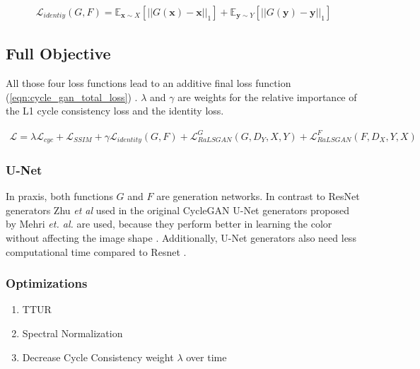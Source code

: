 \documentclass[a4paper,11pt, DIV=12]{scrartcl}
\newcommand{\x}{\boldsymbol{x}}
\newcommand{\y}{\boldsymbol{y}}
\begin{document}
\begin{equation}
   \label{eqn:identity_loss}
   \begin{aligned}
      \mathcal{L}_{identiy}(G, F) = \mathbb{E}_{\x \sim X} \left[||G(\x) - \x||_1\right] + \mathbb{E}_{\y \sim Y} \left[||G(\y) - \y||_1\right]
   \end{aligned}
\end{equation}

\subsection*{Full Objective}
All those four loss functions lead to an additive final loss function (\autoref{eqn:cycle_gan_total_loss}) \cite{mehri2019colorizing}.
$\lambda$ and $\gamma$ are weights for the relative importance of the L1 cycle consistency loss and the identity loss.

\begin{equation}
   \label{eqn:cycle_gan_total_loss}
   \begin{aligned}
      \mathcal{L} = \lambda \mathcal{L}_{cyc} + \mathcal{L}_{SSIM} + \gamma \mathcal{L}_{identity}(G,F) + \mathcal{L}_{RaLSGAN}^G(G,D_Y,X,Y) + \mathcal{L}_{RaLSGAN}^F(F,D_X,Y,X)
   \end{aligned}
\end{equation}

\subsubsection*{U-Net}
In praxis, both functions $G$ and $F$ are generation networks. In contrast to ResNet generators \cite{resnet} Zhu \textit{et al} used in the original CycleGAN \cite{cyclegan_orig}
U-Net generators \cite{unet} proposed by Mehri \textit{et. al.} are used, because they perform better in learning the color without affecting the image shape \cite{mehri2019colorizing}.
Additionally, U-Net generators also need less computational time compared to Resnet \cite{mehri2019colorizing}.

\subsubsection*{Optimizations}
\begin{enumerate}
   \item TTUR
   \item Spectral Normalization
   \item Decrease Cycle Consistency weight $\lambda$ over time
\end{enumerate}
\end{document}
